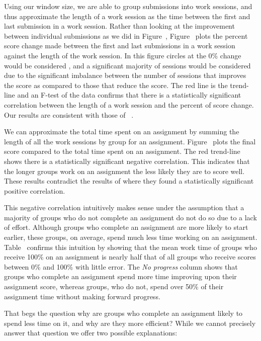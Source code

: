 Using our window size, we are able to group submissions into work sessions, and
thus approximate the length of a work session as the time between the first and
last submission in a work session. Rather than looking at the improvement
between individual submissions as we did in
Figure~, Figure~
plots the percent score change made between the first and last submissions in a
work session against the length of the work session. In this figure circles at
the 0\% change would be considered \noi{}, and a significant majority of
sessions would be considered \imp{} due to the significant imbalance between
the number of sessions that improves the score as compared to those that reduce
the score. The red line is the trend-line and an F-test of the data confirms
that there is a statistically significant correlation between the length of a
work session and the percent of score change. Our results are consistent with
those of \spacco{}~\cite{Spacco:2013:TIP:2462476.2465594}.

We can approximate the total time spent on an assignment by summing the length
of all the work sessions by group for an
assignment. Figure~ plots the final score compared to
the total time spent on an assignment. The red trend-line shows there is a
statistically significant negative correlation. This indicates that the longer
groups work on an assignment the less likely they are to score well. These
results contradict the results of \spacco{} where they found a statistically
significant positive correlation.

This negative correlation intuitively makes sense under the assumption that a
majority of groups who do not complete an assignment do not do so due to a lack
of effort. Although groups who complete an assignment are more likely to start
earlier, these groups, on average, spend much less time working on an
assignment. Table~ confirms this intuition by showing
that the mean work time of groups who receive 100\% on an assignment is nearly
half that of all groups who receive scores between 0\% and 100\% with little
error. The \emph{No progress} column shows that groups who complete an
assignment spend more time improving upon their assignment score, whereas
groups, who do not, spend over 50\% of their assignment time without making
forward progress.

That begs the question why are groups who complete an assignment likely to
spend less time on it, and why are they more efficient? While we cannot
precisely answer that question we offer two possible explanations:

